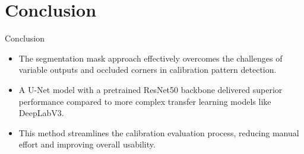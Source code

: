 \section{Conclusion}
\begin{frame}{Conclusion}


      \begin{itemize}
      \Large
      \item<1-> The segmentation mask approach effectively overcomes the challenges of variable
        outputs and occluded corners in calibration pattern detection.
      \item<2->  A U-Net model with a pretrained ResNet50 backbone delivered superior performance
        compared to more complex transfer learning models like DeepLabV3.
      \item<3->  This method streamlines the calibration
evaluation process, reducing manual effort and improving overall usability. 
      \end{itemize}


\end{frame}

\maketitle

